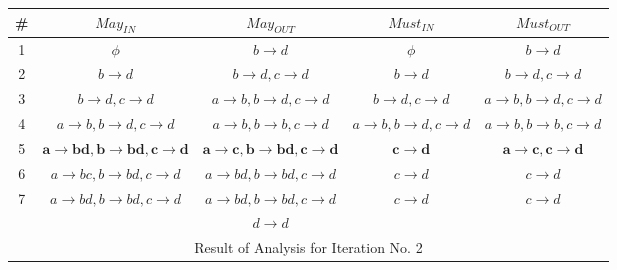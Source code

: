 \documentclass[12pt]{article}
\begin{document}
\begin{enumerate}
{\begin{center}
  \renewcommand{\arraystretch}{1.3}
  \hspace*{-25mm}\begin{tabular}{|c||c|c||c|c|} \hline
    {\bf \#} & {\bf $May_{IN}$} & {\bf $May_{OUT}$} & {\bf
      $Must_{IN}$} & {\bf $Must_{OUT}$}  \\ \hline \hline
    1 & $\phi$ & $b\rightarrow d$& $\phi$ & $b\rightarrow
    d$\\ \hline
    2 & $b\rightarrow d$ & $b\rightarrow d, c \rightarrow d$ & $b\rightarrow
    d$ & $b\rightarrow d, c \rightarrow d$ \\ \hline
    3 & $b\rightarrow d, c \rightarrow d$ & $a
   \rightarrow b, b\rightarrow d,
    c \rightarrow d$ & $b\rightarrow d, c \rightarrow d$ & $a
   \rightarrow b, b\rightarrow d, c \rightarrow d$ \\ \hline
    4 & $a \rightarrow b, b\rightarrow d,
    c \rightarrow d$ & $a \rightarrow b, b\rightarrow b,
    c \rightarrow d$ & $a \rightarrow b, b\rightarrow d,
    c \rightarrow d$ & $a \rightarrow b, b\rightarrow b,
    c \rightarrow d$ \\ \hline
    5 & $\mathbf{a \rightarrow b d, b\rightarrow b d,
    c \rightarrow d}$ & $\mathbf{a \rightarrow c, b\rightarrow b d,
    c \rightarrow d}$ & $\mathbf{c \rightarrow d}$ &$\mathbf{a \rightarrow c, c
    \rightarrow d}$  \\ \hline 
    6 & $a \rightarrow b c, b\rightarrow b d,
    c \rightarrow d$ & $a \rightarrow b d, b\rightarrow b d,
    c \rightarrow d$ & $c \rightarrow d$ & $c \rightarrow d$ \\ \hline
    7 & $a \rightarrow b d, b\rightarrow b d,
    c \rightarrow d$ & $a \rightarrow b d, b\rightarrow b d,
    c \rightarrow d $ & $c \rightarrow d$ & $c \rightarrow d$\\
    & & $d \rightarrow d$ & &  \\ \hline
    \multicolumn{5}{c}{  Result of Analysis for Iteration
      No. 2}
  \end{tabular}
\end{center}

}
\end{enumerate}
\end{document}
